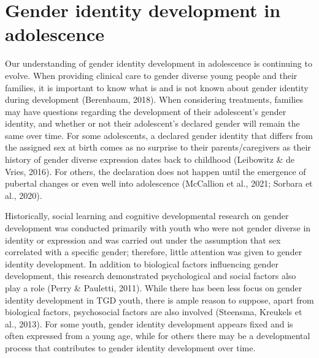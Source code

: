 \documentclass[
]{book}
\begin{document}
\hypertarget{gender-identity-development-in-adolescence}{%
\section*{Gender identity development in adolescence}\label{gender-identity-development-in-adolescence}}

Our understanding of gender identity development in adolescence is continuing to evolve.
When providing clinical care to gender diverse
young people and their families, it is important
to know what is and is not known about gender
identity during development (Berenbaum, 2018).
When considering treatments, families may have
questions regarding the development of their
adolescent's gender identity, and whether or not
their adolescent's declared gender will remain
the same over time. For some adolescents, a
declared gender identity that differs from the
assigned sex at birth comes as no surprise to
their parents/caregivers as their history of gender diverse expression dates back to childhood
(Leibowitz \& de Vries, 2016). For others, the
declaration does not happen until the emergence
of pubertal changes or even well into adolescence (McCallion et al., 2021; Sorbara
et al., 2020).

Historically, social learning and cognitive
developmental research on gender development
was conducted primarily with youth who were
not gender diverse in identity or expression and
was carried out under the assumption that sex
correlated with a specific gender; therefore, little
attention was given to gender identity development. In addition to biological factors influencing
gender development, this research demonstrated
psychological and social factors also play a role
(Perry \& Pauletti, 2011). While there has been
less focus on gender identity development in
TGD youth, there is ample reason to suppose,
apart from biological factors, psychosocial factors
are also involved (Steensma, Kreukels et al.,
2013). For some youth, gender identity development appears fixed and is often expressed from
a young age, while for others there may be a
developmental process that contributes to gender
identity development over time.
\end{document}

